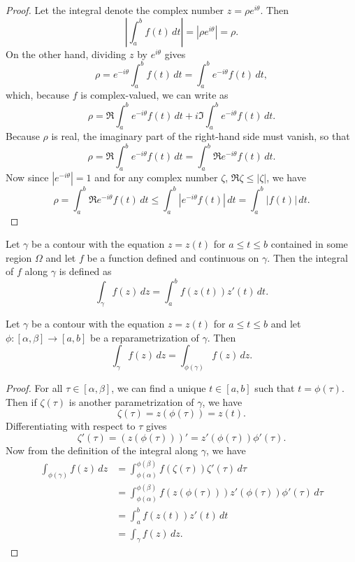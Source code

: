 \begin{proof}
    Let the integral denote the complex number \(z = \rho e^{i\theta}\). Then
    \[
        \left| \int_a^b f(t) \, dt \right| = \left| \rho e^{i\theta} \right| = \rho.
    \]
    On the other hand, dividing \(z\) by \(e^{i\theta}\) gives
    \[
        \rho = e^{-i\theta} \int_a^b f(t) \, dt = \int_a^b e^{-i\theta} f(t) \, dt,
    \]
    which, because \(f\) is complex-valued, we can write as
    \[
        \rho = \Re \int_a^b e^{-i\theta} f(t) \, dt + i \Im \int_a^b e^{-i\theta} f(t) \, dt.
    \]
    Because \(\rho\) is real, the imaginary part of the right-hand side must vanish, so that
    \[
        \rho = \Re \int_a^b e^{-i\theta} f(t) \, dt = \int_a^b \Re e^{-i\theta} f(t) \, dt.
    \]
    Now since \(|e^{-i\theta}| = 1\) and for any complex number \(\zeta\), \(\Re \zeta \leq |\zeta|\), we have
    \[
        \rho = \int_a^b \Re e^{-i\theta} f(t) \, dt \leq \int_a^b |e^{-i\theta} f(t)| \, dt = \int_a^b |f(t)| \, dt.
    \]
\end{proof}



\begin{definition}
    Let \(\gamma\) be a contour with the equation \(z = z(t)\) for \(a \leq t \leq b\) contained in some region \(\Omega\) and let \(f\) be a function defined and continuous on \(\gamma\). Then the integral of \(f\) along \(\gamma\) is defined as
    \[
        \int_\gamma f(z) \, dz = \int_a^b f(z(t)) z'(t) \, dt.
    \]
\end{definition}

\begin{theorem}
    Let \(\gamma\) be a contour with the equation \(z = z(t)\) for \(a \leq t \leq b\) and let \(\phi: [\alpha, \beta] \to [a, b]\) be a reparametrization of \(\gamma\). Then
    \[
        \int_\gamma f(z) \, dz = \int_{\phi(\gamma)} f(z) \, dz.
    \]
\end{theorem}

\begin{proof}
    For all \(\tau \in [\alpha, \beta]\), we can find a unique \(t \in [a, b]\) such that \(t = \phi(\tau)\). Then if \(\zeta(\tau)\) is another parametrization of \(\gamma\), we have
    \[
        \zeta(\tau) = z(\phi(\tau)) = z(t).
    \]
    Differentiating with respect to \(\tau\) gives
    \[
        \zeta'(\tau) = \left( z(\phi(\tau)) \right)' = z'(\phi(\tau)) \phi'(\tau).
    \]
    Now from the definition of the integral along \(\gamma\), we have
    \begin{align*}
        \int_{\phi(\gamma)} f(z) \, dz &= \int_{\phi(\alpha)}^{\phi(\beta)} f(\zeta(\tau)) \zeta'(\tau) \, d\tau \\
        &= \int_{\phi(\alpha)}^{\phi(\beta)} f(z(\phi(\tau))) z'(\phi(\tau)) \phi'(\tau) \, d\tau \\
        &= \int_{a}^{b} f(z(t)) z'(t) \, dt\\
        &= \int_{\gamma} f(z) \, dz.
    \end{align*}
\end{proof}

